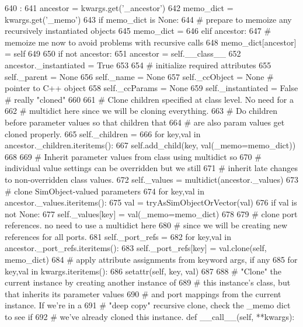 \begin{DoxyCode}
640                                 :
641         ancestor = kwargs.get('_ancestor')
642         memo_dict = kwargs.get('_memo')
643         if memo_dict is None:
644             # prepare to memoize any recursively instantiated objects
645             memo_dict = {}
646         elif ancestor:
647             # memoize me now to avoid problems with recursive calls
648             memo_dict[ancestor] = self
649 
650         if not ancestor:
651             ancestor = self.__class__
652         ancestor._instantiated = True
653 
654         # initialize required attributes
655         self._parent = None
656         self._name = None
657         self._ccObject = None  # pointer to C++ object
658         self._ccParams = None
659         self._instantiated = False # really "cloned"
660 
661         # Clone children specified at class level.  No need for a
662         # multidict here since we will be cloning everything.
663         # Do children before parameter values so that children that
664         # are also param values get cloned properly.
665         self._children = {}
666         for key,val in ancestor._children.iteritems():
667             self.add_child(key, val(_memo=memo_dict))
668 
669         # Inherit parameter values from class using multidict so
670         # individual value settings can be overridden but we still
671         # inherit late changes to non-overridden class values.
672         self._values = multidict(ancestor._values)
673         # clone SimObject-valued parameters
674         for key,val in ancestor._values.iteritems():
675             val = tryAsSimObjectOrVector(val)
676             if val is not None:
677                 self._values[key] = val(_memo=memo_dict)
678 
679         # clone port references.  no need to use a multidict here
680         # since we will be creating new references for all ports.
681         self._port_refs = {}
682         for key,val in ancestor._port_refs.iteritems():
683             self._port_refs[key] = val.clone(self, memo_dict)
684         # apply attribute assignments from keyword args, if any
685         for key,val in kwargs.iteritems():
686             setattr(self, key, val)
687 
688     # "Clone" the current instance by creating another instance of
689     # this instance's class, but that inherits its parameter values
690     # and port mappings from the current instance.  If we're in a
691     # "deep copy" recursive clone, check the _memo dict to see if
692     # we've already cloned this instance.
    def __call__(self, **kwargs):
\end{DoxyCode}
